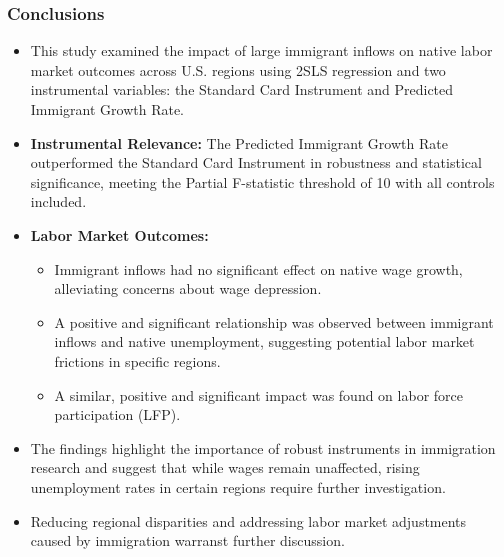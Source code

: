 \begin{frame}
    \frametitle{Conclusions}
    \begin{itemize}
        \item This study examined the impact of large immigrant inflows on native labor market outcomes across U.S. regions using 2SLS regression and two instrumental variables: the Standard Card Instrument and Predicted Immigrant Growth Rate.
        \item \textbf{Instrumental Relevance:} The Predicted Immigrant Growth Rate outperformed the Standard Card Instrument in robustness and statistical significance, meeting the Partial F-statistic threshold of 10 with all controls included.
        \item \textbf{Labor Market Outcomes:}
        \begin{itemize}
            \item Immigrant inflows had no significant effect on native wage growth, alleviating concerns about wage depression.
            \item A positive and significant relationship was observed between immigrant inflows and native unemployment, suggesting potential labor market frictions in specific regions.
            \item A similar, positive and significant impact was found on labor force participation (LFP).
        \end{itemize}
        \item The findings highlight the importance of robust instruments in immigration research and suggest that while wages remain unaffected, rising unemployment rates in certain regions require further investigation.
        \item Reducing regional disparities and addressing labor market adjustments caused by immigration warranst further discussion.
    \end{itemize}
\end{frame}
